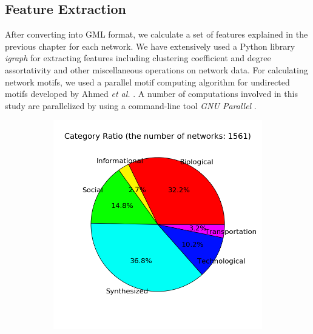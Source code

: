 \documentclass{article}
\begin{document}
	\subsection{Feature Extraction}
	After converting into GML format, we calculate a set of features explained in the previous chapter for each network. We have extensively used a Python library \textit{igraph} \cite{igraph} for extracting features including clustering coefficient and degree assortativity and other miscellaneous operations on network data. For calculating network motifs, we used a parallel motif computing algorithm for undirected motifs developed by Ahmed \textit{et al.} \cite{ahmed2015icdm}. A number of computations involved in this study are parallelized by using a command-line tool \textit{GNU Parallel} \cite{GNUParallel}.

\begin{figure}[H]
\begin{subfigure}{0.40\textwidth}
\includegraphics[width=\linewidth]{figs/category_ratio.png}
\caption{}\label{domain_ratio}
\end{subfigure}\hspace*{\fill}
\begin{subfigure}{0.45\textwidth}

\end{subfigure}
\end{figure}
\end{document}
